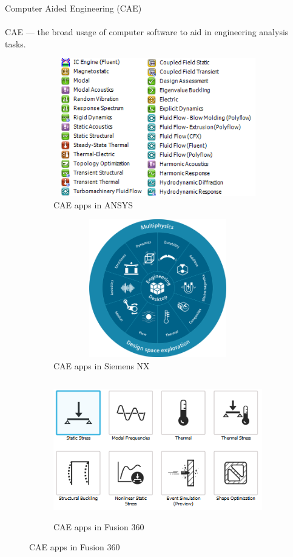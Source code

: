 \documentclass[aspectratio=169]{beamer}
\begin{document}
\begin{frame}[t]{Computer Aided Engineering (CAE)}
\framesubtitle{}
    CAE --- the broad usage of computer software to aid in engineering analysis tasks.


\begin{figure}[H]
    \begin{subfigure}{0.32\textwidth}
        \centering\includegraphics[height=6cm,width=1\textwidth,keepaspectratio]{cae_apps_ansys.png}
        \caption*{CAE apps in ANSYS}
        \label{fig:cae_apps_ansys.png}
    \end{subfigure}
    \begin{subfigure}{0.32\textwidth}
        \centering\includegraphics[height=6cm,width=1\textwidth,keepaspectratio]{cae_apps_nx.png}
        \caption*{CAE apps in Siemens NX}
        \label{fig:cae_apps_nx.png}
    \end{subfigure}
    \begin{subfigure}{0.32\textwidth}
        \centering\includegraphics[height=6cm,width=1\textwidth,keepaspectratio]{cae_apps_fusion.png}
        \caption*{CAE apps in Fusion 360}
        \label{fig:cae_apps_fusion.png}
    \end{subfigure}
\end{figure}
\end{frame}
\end{document}
